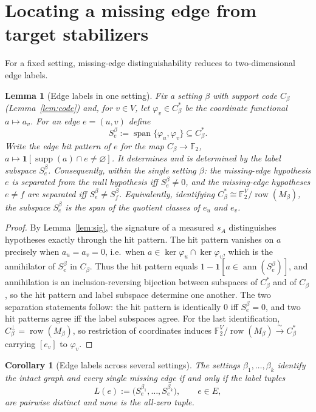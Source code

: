 \documentclass[11pt]{article}
\newtheorem{lemma}[theorem]{Lemma}
\newtheorem{corollary}[theorem]{Corollary}
\theoremstyle{remark}
\newcommand{\F}{\mathbb{F}}
\newcommand{\supp}{\operatorname{supp}}
\begin{document}
\section{Locating a missing edge from target stabilizers}\label{sec:param}
For a fixed setting, missing-edge distinguishability reduces to two-dimensional edge labels.

\begin{lemma}[Edge labels in one setting]\label{lem:span}
Fix a setting $\beta$ with support code $C_\beta$ (Lemma~\ref{lem:code}) and, for $v\in V$, let $\varphi_v\in C_\beta^*$ be the coordinate functional $a\mapsto a_v$. For an edge $e=(u,v)$ define
\[
S_e^\beta:=\operatorname{span}\{\varphi_u,\varphi_v\}\subseteq C_\beta^*.
\]
Write the edge hit pattern of $e$ for the map $C_\beta\to\F_2$, $a\mapsto\mathbf 1[\supp(a)\cap e\neq\varnothing]$. It determines and is determined by the label subspace $S_e^\beta$. Consequently, within the single setting $\beta$: the missing-edge hypothesis $e$ is separated from the null hypothesis iff $S_e^\beta\neq0$, and the missing-edge hypotheses $e\neq f$ are separated iff $S_e^\beta\neq S_f^\beta$. Equivalently, identifying $C_\beta^*\cong\F_2^V/\operatorname{row}(M_\beta)$, the subspace $S_e^\beta$ is the span of the quotient classes of $e_u$ and $e_v$.
\end{lemma}

\begin{proof}
By Lemma~\ref{lem:sig}, the signature of a measured $s_A$ distinguishes hypotheses exactly through the hit pattern. The hit pattern vanishes on $a$ precisely when $a_u=a_v=0$, i.e.\ when $a\in\ker\varphi_u\cap\ker\varphi_v$, which is the annihilator of $S_e^\beta$ in $C_\beta$. Thus the hit pattern equals $1-\mathbf 1[a\in\operatorname{ann}(S_e^\beta)]$, and annihilation is an inclusion-reversing bijection between subspaces of $C_\beta^*$ and of $C_\beta$, so the hit pattern and label subspace determine one another. The two separation statements follow: the hit pattern is identically $0$ iff $S_e^\beta=0$, and two hit patterns agree iff the label subspaces agree. For the last identification, $C_\beta^\perp=\operatorname{row}(M_\beta)$, so restriction of coordinates induces $\F_2^V/\operatorname{row}(M_\beta)\xrightarrow{\ \sim\ }C_\beta^*$ carrying $[e_v]$ to $\varphi_v$.
\end{proof}

\begin{corollary}[Edge labels across several settings]\label{cor:labels}
The settings $\beta_1,\dots,\beta_k$ identify the intact graph and every single missing edge if and only if the label tuples
\[
L(e):=\big(S_e^{\beta_1},\dots,S_e^{\beta_k}\big),\qquad e\in E,
\]
are pairwise distinct and none is the all-zero tuple.
\end{corollary}
\end{document}
